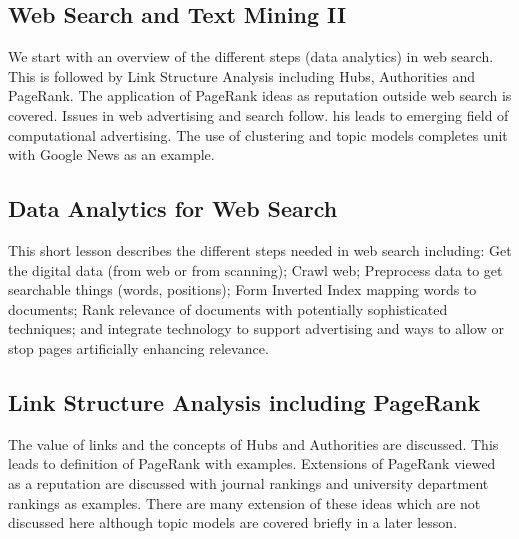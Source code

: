 \subsection{Web Search and Text Mining
II}\label{web-search-and-text-mining-ii}


We start with an overview of the different steps (data analytics) in web
search. This is followed by Link Structure Analysis including Hubs,
Authorities and PageRank. The application of PageRank ideas as
reputation outside web search is covered. Issues in web advertising and
search follow. his leads to emerging field of computational advertising.
The use of clustering and topic models completes unit with Google News
as an example.



\subsection{Data Analytics for Web Search}\label{data-analytics-for-web-search}


This short lesson describes the different steps needed in web search
including: Get the digital data (from web or from scanning); Crawl web;
Preprocess data to get searchable things (words, positions); Form
Inverted Index mapping words to documents; Rank relevance of documents
with potentially sophisticated techniques; and integrate technology to
support advertising and ways to allow or stop pages artificially
enhancing relevance.




\subsection{Link Structure Analysis including PageRank}\label{link-structure-analysis-including-pagerank}


The value of links and the concepts of Hubs and Authorities are
discussed. This leads to definition of PageRank with examples.
Extensions of PageRank viewed as a reputation are discussed with journal
rankings and university department rankings as examples. There are many
extension of these ideas which are not discussed here although topic
models are covered briefly in a later lesson.



